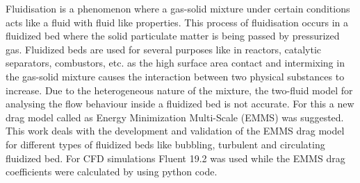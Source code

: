 \documentclass[sprache=english,doktyp=marbeit,fontsize=12pt]{TUBAFarbeiten}
\begin{document}
\maketitle

\TUBAFErklaerungsseite

%
%

Fluidisation is a phenomenon where a gas-solid mixture under certain conditions acts like a fluid with fluid like properties. This process of fluidisation occurs in a fluidized bed where the solid particulate matter is being passed by pressurized gas. Fluidized beds are used for several purposes like in reactors, catalytic separators, combustors, etc. as the high surface area contact and intermixing in the gas-solid mixture causes the interaction between two physical substances to increase. Due to the heterogeneous nature of the mixture, the two-fluid model for analysing the flow behaviour inside a fluidized bed is not accurate. For this a new drag model called as Energy Minimization Multi-Scale (EMMS) was suggested. This work deals with the development and validation of the EMMS drag model for different types of fluidized beds like bubbling, turbulent and circulating fluidized bed. For CFD simulations Fluent 19.2 was used while the EMMS drag coefficients were calculated by using python code.
\end{document}
